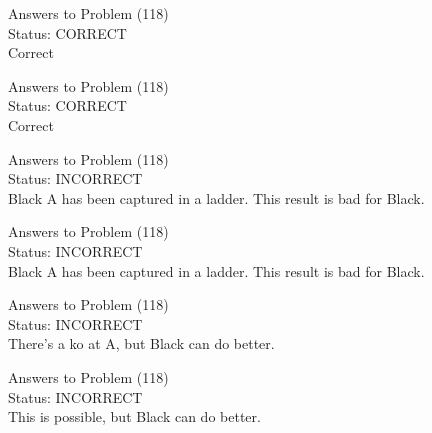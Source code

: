 \documentclass[11pt]{article}
\begin{document}
\begin{minipage}[t]{0.5\textwidth}
  {\centering
  
  Answers to Problem (118)\\
  Status: CORRECT\\
  Correct\\
  }
\end{minipage}
\begin{minipage}[t]{0.5\textwidth}
  {\centering
  
  Answers to Problem (118)\\
  Status: CORRECT\\
  Correct\\
  }
\end{minipage}
\begin{minipage}[t]{0.5\textwidth}
  {\centering
  
  Answers to Problem (118)\\
  Status: INCORRECT\\
  Black A has been captured in a ladder. This result is bad for Black.\\
  }
\end{minipage}
\begin{minipage}[t]{0.5\textwidth}
  {\centering
  
  Answers to Problem (118)\\
  Status: INCORRECT\\
  Black A has been captured in a ladder. This result is bad for Black.\\
  }
\end{minipage}
\begin{minipage}[t]{0.5\textwidth}
  {\centering
  
  Answers to Problem (118)\\
  Status: INCORRECT\\
  There's a ko at A, but Black can do better.\\
  }
\end{minipage}
\begin{minipage}[t]{0.5\textwidth}
  {\centering
  
  Answers to Problem (118)\\
  Status: INCORRECT\\
  This is possible, but Black can do better.\\
  }
\end{minipage}
\end{document}
